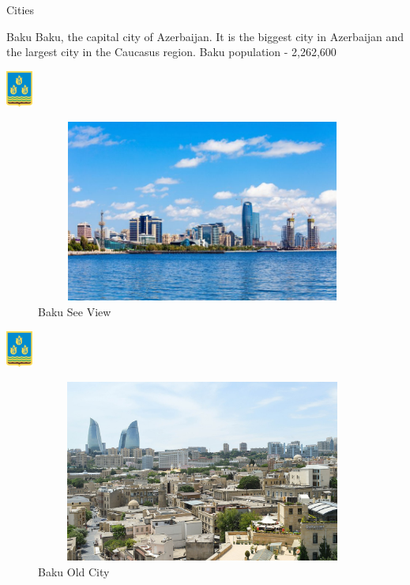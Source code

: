 \documentclass[hyperref={pdfpagemode=FullScreen}]{beamer}
\begin{document}
\begin{frame}{Cities}
\begin{alertblock}{Baku}
\justifying Baku, the capital city of Azerbaijan. It is the biggest city in Azerbaijan and the largest city in the Caucasus region. Baku population - 2,262,600
\end{alertblock}
\end{frame}

\begin{frame}{\includegraphics[width=.9cm, height=1.2cm]{img/baku04.png}}
    \begin{figure}
        \includegraphics[width=11cm, height=6cm]{img/baku01.jpg}
        \caption{Baku See View} 
    \end{figure}
\end{frame}

\begin{frame}{\includegraphics[width=.9cm, height=1.2cm]{img/baku04.png}}
    \begin{figure}
        \includegraphics[width=11cm, height=6cm]{img/baku02.jpeg}
        \caption{Baku Old City} 
    \end{figure}
\end{frame}
\end{document}
